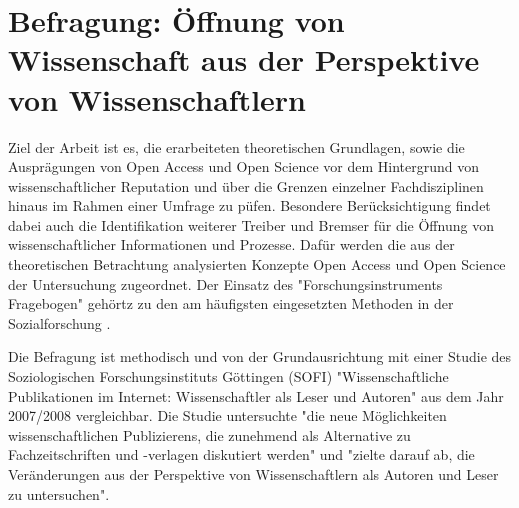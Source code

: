 \chapter{Befragung: Öffnung von Wissenschaft aus der Perspektive von Wissenschaftlern}

Ziel der Arbeit ist es, die erarbeiteten theoretischen Grundlagen, sowie die Ausprägungen von Open Access und Open Science vor dem Hintergrund von wissenschaftlicher Reputation und über die Grenzen einzelner Fachdisziplinen hinaus im Rahmen einer Umfrage zu püfen. Besondere Berücksichtigung findet dabei auch die Identifikation weiterer Treiber und Bremser für die Öffnung von wissenschaftlicher Informationen und Prozesse. Dafür werden die aus der theoretischen Betrachtung analysierten Konzepte Open Access und Open Science der Untersuchung zugeordnet. Der Einsatz des "Forschungsinstruments Fragebogen" gehörtz zu den am häufigsten eingesetzten Methoden in der Sozialforschung \cite{raab_2012_fragebogen}.

Die Befragung ist methodisch und von der Grundausrichtung mit einer Studie des Soziologischen Forschungsinstituts Göttingen (SOFI) "Wissenschaftliche Publikationen im Internet: Wissenschaftler als Leser und Autoren" aus dem Jahr 2007/2008 vergleichbar. Die Studie untersuchte "die neue Möglichkeiten wissenschaftlichen Publizierens, die zunehmend als Alternative zu Fachzeitschriften und -verlagen diskutiert werden" und "zielte darauf ab, die Veränderungen aus der Perspektive von Wissenschaftlern als Autoren und Leser zu untersuchen"\cite{SOFI_Webseite}.

